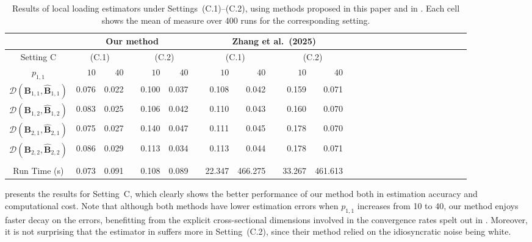 \documentclass[aos]{imsart}
\theoremstyle{plain}
\theoremstyle{definition}
\def\wh#1{\widehat{#1}}
\def\cD{\mathcal{D}}
\def\bB{\mathbf{B}}
\begin{document}
\begin{table}%
\caption {Results of local loading estimators under Settings~(C.1)--(C.2), using methods proposed in this paper and in \cite{Zhangetal2025}. Each cell shows the mean of measure over 400 runs for the corresponding setting.}
\label{tab: simulation_setting_C}
\begin{tabular}{@{}crrrrrrrrrrrrrrrrrrrrrrrrr@{}}
\hline %
& \multicolumn{5}{c}{Our method} && \multicolumn{5}{c}{Zhang et al.~(2025)} \\
\hline %
Setting C & \multicolumn{2}{c}{(C.1)} && \multicolumn{2}{c}{(C.2)} && \multicolumn{2}{c}{(C.1)} && \multicolumn{2}{c}{(C.2)}  \\
$p_{1,1}$
&  $10$ & $40$ && $10$ & $40$ && $10$ & $40$
&& $10$ & $40$ \\
\hline %
$\cD(\bB_{1,1}, \wh{\bB}_{1,1})$ &  0.076 & 0.022 && 0.100 & 0.037  && 0.108 & 0.042 && 0.159 & 0.071  \\
$\cD(\bB_{1,2}, \wh{\bB}_{1,2})$ &  0.083 & 0.025 && 0.106 & 0.042  && 0.110 & 0.043 && 0.160 & 0.070  \\
$\cD(\bB_{2,1}, \wh{\bB}_{2,1})$ &  0.075 & 0.027 && 0.140 & 0.047  && 0.111 & 0.045 && 0.178 & 0.070  \\
$\cD(\bB_{2,2}, \wh{\bB}_{2,2})$ &  0.086 & 0.029 && 0.113 & 0.034  && 0.113 & 0.044 && 0.178 & 0.071  \\
\\
Run Time (s) &  0.073 & 0.091 && 0.108 & 0.089  && 22.347 & 466.275 && 33.267 & 461.613  \\
\hline %
\end{tabular}
\end{table}





 presents the results for Setting~C, which clearly shows the better performance of our method both in estimation accuracy and computational cost. Note that although both methods have lower estimation errors when $p_{1,1}$ increases from 10 to 40, our method enjoys faster decay on the errors, benefitting from the explicit cross-sectional dimensions involved in the convergence rates spelt out in . Moreover, it is not surprising that the estimator in \cite{Zhangetal2025} suffers more in Setting~(C.2), since their method relied on the idiosyncratic noise being white.
\end{document}
